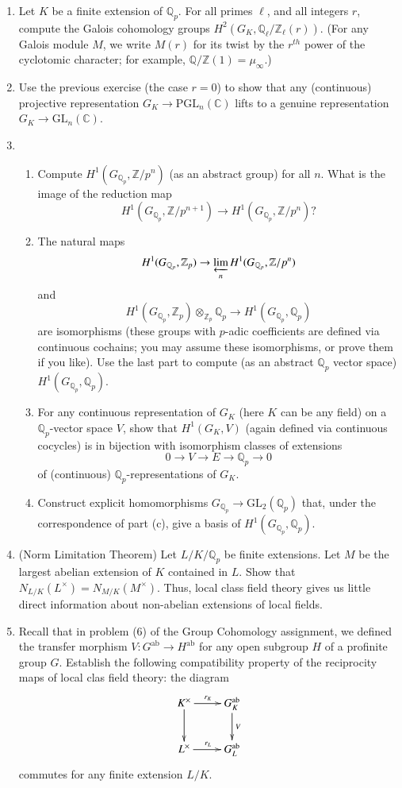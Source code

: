 \documentclass[11pt,answers,addpoints,reqno]{exam}
\theoremstyle{definition}
\theoremstyle{remark}
\theoremstyle{definition}
\theoremstyle{remark}
\theoremstyle{remark}
\theoremstyle{remark}
\newcommand{\Q}{\mathbb{Q}}
\newcommand{\Z}{\mathbb{Z}}
\newcommand{\CC}{\mathbb{C}}
\newcommand{\mr}{\mathrm}
\begin{document}
\begin{enumerate}
\begin{enumerate}
\end{enumerate}
\item Let $K$ be a finite extension of $\Q_p$. For all primes $\ell$, and all integers $r$, compute the Galois cohomology groups $H^2(G_K, \Q_{\ell}/\Z_{\ell}(r))$. (For any Galois module $M$, we write $M(r)$ for its twist by the $r^{th}$ power of the cyclotomic character; for example, $\Q/\Z(1)= \mu_{\infty}$.)
\item Use the previous exercise (the case $r=0$) to show that any (continuous) projective representation $G_K \to \mr{PGL}_n(\CC)$ lifts to a genuine representation $G_K \to \mr{GL}_n(\CC)$.
\item 
\begin{enumerate}
\item Compute $H^1(G_{\Q_p}, \Z/p^n)$ (as an abstract group) for all $n$. What is the image of the reduction map
\[
H^1(G_{\Q_p}, \Z/p^{n+1}) \to H^1(G_{\Q_p}, \Z/p^n)?
\]
\item The natural maps 
\[
H^1(G_{\Q_p}, \Z_p) \to \varprojlim_n H^1(G_{\Q_p}, \Z/p^n)
\] 
and
\[
H^1(G_{\Q_p}, \Z_p) \otimes_{\Z_p} \Q_p \to H^1(G_{\Q_p}, \Q_p)
\]
are isomorphisms (these groups with $p$-adic coefficients are defined via continuous cochains; you may assume these isomorphisms, or prove them if you like). Use the last part to compute (as an abstract $\Q_p$ vector space) $H^1(G_{\Q_p}, \Q_p)$.
\item For any continuous representation of $G_{K}$ (here $K$ can be any field) on a $\Q_p$-vector space $V$, show that $H^1(G_K, V)$ (again defined via continuous cocycles) is in bijection with isomorphism classes of extensions
\[
0 \to V \to E \to \Q_p \to 0
\]
of (continuous) $\Q_p$-representations of $G_K$.
\item Construct explicit homomorphisms $G_{\Q_p} \to \mr{GL}_2(\Q_p)$ that, under the correspondence of part (c), give a basis of $H^1(G_{\Q_p}, \Q_p)$.
\end{enumerate}
\item (Norm Limitation Theorem) Let $L/K/\Q_p$ be finite extensions. Let $M$ be the largest abelian extension of $K$ contained in $L$. Show that $N_{L/K}(L^\times)= N_{M/K}(M^{\times})$. Thus, local class field theory gives us little direct information about non-abelian extensions of local fields.
\item \label{Ver} Recall that in problem (6) of the Group Cohomology assignment, we defined the transfer morphism $V \colon G^{\mr{ab}} \to H^{\mr{ab}}$ for any open subgroup $H$ of a profinite group $G$. Establish the following compatibility property of the reciprocity maps of local clas field theory: the diagram
\[
 \xymatrix{
K^\times \ar[r]^{r_K} \ar[d] & G_K^{\mr{ab}}\ar[d]^V \\
L^\times \ar[r]^{r_L} & G_L^{\mr{ab}}
}
\]
commutes for any finite extension $L/K$.
\end{enumerate}
\end{document}
